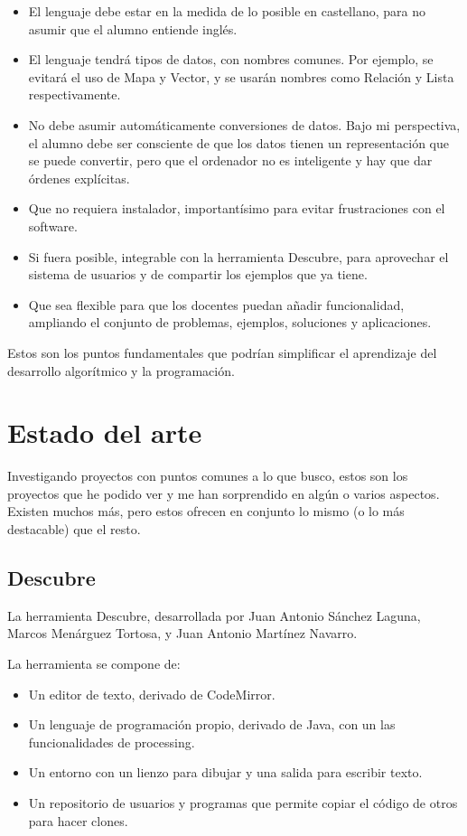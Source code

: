\documentclass{report}
\begin{document}
	\begin{itemize}
		\item El lenguaje debe estar en la medida de lo posible en castellano, para no asumir que el alumno entiende inglés.
		\item El lenguaje tendrá tipos de datos, con nombres comunes. Por ejemplo, se evitará el uso de Mapa y Vector, y se usarán nombres como Relación y Lista respectivamente.
		\item No debe asumir automáticamente conversiones de datos. Bajo mi perspectiva, el alumno debe ser consciente de que los datos tienen un representación que se puede convertir, pero que el ordenador no es inteligente y hay que dar órdenes explícitas.
		\item Que no requiera instalador, importantísimo para evitar frustraciones con el software. 
		\item Si fuera posible, integrable con la herramienta Descubre, para aprovechar el sistema de usuarios y de compartir los ejemplos que ya tiene.
		\item Que sea flexible para que los docentes puedan añadir funcionalidad, ampliando el conjunto de problemas, ejemplos, soluciones y aplicaciones.
	\end{itemize} 
	
	Estos son los puntos fundamentales que podrían simplificar el aprendizaje del desarrollo algorítmico y la programación.
	
	\section{Estado del arte}
	
	Investigando proyectos con puntos comunes a lo que busco, estos son los proyectos que he podido ver y me han sorprendido en algún o varios aspectos. Existen muchos más, pero estos ofrecen en conjunto lo mismo (o lo más destacable) que el resto.
	
	\subsection{Descubre}
	
	La herramienta Descubre, desarrollada por Juan Antonio Sánchez Laguna, Marcos Menárguez Tortosa, y Juan Antonio Martínez Navarro. 
	
	La herramienta se compone de:
	
	
	\begin{itemize}
		\item Un editor de texto, derivado de CodeMirror.
		\item Un lenguaje de programación propio, derivado de Java, con un las funcionalidades de processing.
		\item Un entorno con un lienzo para dibujar y una salida para escribir texto.
		\item Un repositorio de usuarios y programas que permite copiar el código de otros para hacer clones. 
	\end{itemize}
	
\end{document}
